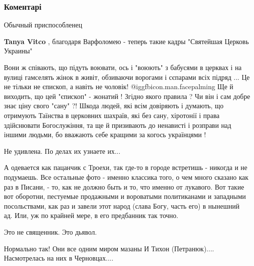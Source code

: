  
 
 
 
 
\subsubsection{Коментарі}

\begin{itemize} %
Обычный приспособленец


\textbf{Tanya Vitco} , благодаря Варфоломею - теперь такие кадры "Святейшая Церковь Украины"


Вони ж співають, що підуть воювати, ось і "воюють" з бабусями в церквах і на
вулиці гамселять жінок в живіт, обзиваючи ворогами і сєпарами всіх підряд ...
Це не тільки не єпископ, а навіть не чоловік!  @igg{fbicon.man.facepalming}  Ще й виходить, що цей
"єпископ" - жонатий ! Згідно якого правила ? Чи він і сам добре знає ціну свого
"сану" ?! Шкода людей, які всім довіряють і думають, що отримують Таїнства в
церковних шахраїв, які без сану, хіротонії і права здійснювати Богослужіння, та
ще й призивають до ненависті і розправи над іншими людьми, бо вважають себе
кращими за когось українцями !

Не удивлена. По делах их узнаете их...


А одевается как пацанчик с Троехи, так где-то в городе встретишь - никогда и не
подумаешь. Все остальные фото - именно классика того, о чем много сказано как
раз в Писани, - то, как не должно быть и то, что именно от лукавого. Вот такие
вот оборотни, пестуемые продажными и вороватыми политиканами и западными
посольствами, как раз и завели этот народ (слава Богу, часть его) в нынешний
ад. Или, уж по крайней мере, в его предбанник так точно.

Это не священник. Это дьявол.

Нормально так! Они все одним миром мазаны И Тихон (Петранюк).... Насмотрелась на них в Черновцах....


\end{itemize}
